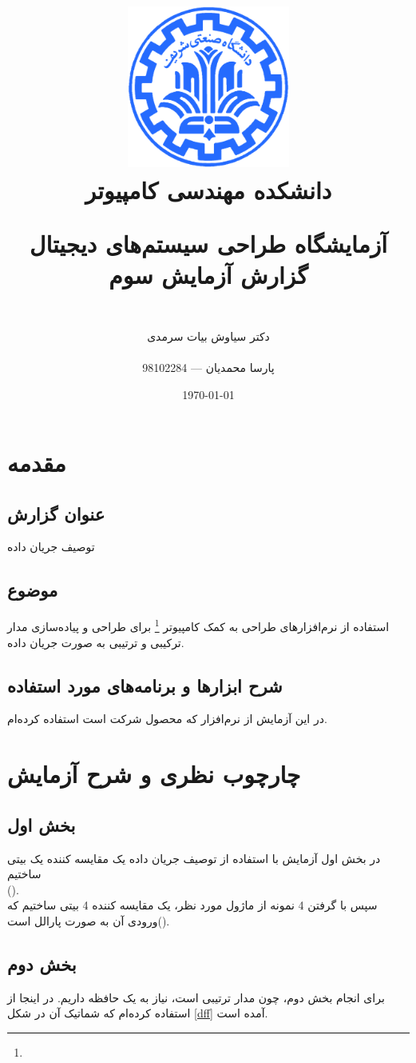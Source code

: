 \documentclass[fleqn]{article}
\title{
\includegraphics[width=0.4\textwidth]{sharif.png}\\
\normalsize{دانشکده مهندسی کامپیوتر}\\
\vspace{1cm}
	
\huge{آزمایشگاه طراحی سیستم‌های دیجیتال}
\\
\Large{گزارش آزمایش سوم}
\\
}
\author{
\\
دکتر سیاوش بیات سرمدی
\\
\\
پارسا محمدیان --- 98102284
}
\date{\today}
\begin{document}
\clearpage\maketitle
\thispagestyle{empty}

\newpage

\pagestyle{fancy}



\tableofcontents

\setcounter{page}{1}

\newpage

\section{مقدمه}

\subsection*{عنوان گزارش}
توصیف جریان داده
\subsection*{موضوع}
استفاده از نرم‌افزارهای طراحی به کمک کامپیوتر \footnote{} برای طراحی 
و پیاده‌سازی مدار ترکیبی و ترتیبی به صورت جریان داده.
\subsection*{شرح ابزارها و برنامه‌های مورد استفاده}
در این آزمایش از نرم‌افزار  که محصول شرکت  است 
استفاده کرده‌ام.

\section{چارچوب نظری و شرح آزمایش}
\subsection{بخش اول}
در بخش اول آزمایش با استفاده از توصیف جریان داده یک مقایسه کننده یک بیتی 
ساختیم
\\().
\\
 سپس با گرفتن 4 نمونه از ماژول مورد نظر، یک 
مقایسه کننده 4 بیتی ساختیم که ورودی آن به صورت پارالل 
است().

\subsection{بخش دوم}
برای انجام بخش دوم، چون مدار ترتیبی است، نیاز به یک حافظه داریم. در اینجا 
از  استفاده کرده‌ام که شماتیک آن در شکل \ref{dff} آمده است.
\end{document}
